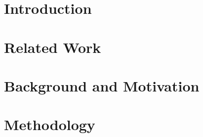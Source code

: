 \graphicspath{{figs/}}

\section{Introduction}


\section{Related Work}


\section{Background and Motivation}


\section{Methodology}


